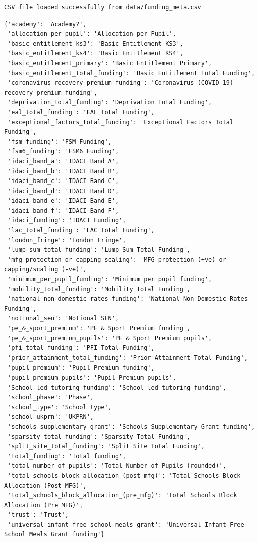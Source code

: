 \documentclass[
  letterpaper,
  DIV=11,
  numbers=noendperiod]{scrartcl}
\begin{document}
\begin{verbatim}
CSV file loaded successfully from data/funding_meta.csv
\end{verbatim}

\begin{verbatim}
{'academy': 'Academy?',
 'allocation_per_pupil': 'Allocation per Pupil',
 'basic_entitlement_ks3': 'Basic Entitlement KS3',
 'basic_entitlement_ks4': 'Basic Entitlement KS4',
 'basic_entitlement_primary': 'Basic Entitlement Primary',
 'basic_entitlement_total_funding': 'Basic Entitlement Total Funding',
 'coronavirus_recovery_premium_funding': 'Coronavirus (COVID-19) recovery premium funding',
 'deprivation_total_funding': 'Deprivation Total Funding',
 'eal_total_funding': 'EAL Total Funding',
 'exceptional_factors_total_funding': 'Exceptional Factors Total Funding',
 'fsm_funding': 'FSM Funding',
 'fsm6_funding': 'FSM6 Funding',
 'idaci_band_a': 'IDACI Band A',
 'idaci_band_b': 'IDACI Band B',
 'idaci_band_c': 'IDACI Band C',
 'idaci_band_d': 'IDACI Band D',
 'idaci_band_e': 'IDACI Band E',
 'idaci_band_f': 'IDACI Band F',
 'idaci_funding': 'IDACI Funding',
 'lac_total_funding': 'LAC Total Funding',
 'london_fringe': 'London Fringe',
 'lump_sum_total_funding': 'Lump Sum Total Funding',
 'mfg_protection_or_capping_scaling': 'MFG protection (+ve) or capping/scaling (-ve)',
 'minimum_per_pupil_funding': 'Minimum per pupil funding',
 'mobility_total_funding': 'Mobility Total Funding',
 'national_non_domestic_rates_funding': 'National Non Domestic Rates Funding',
 'notional_sen': 'Notional SEN',
 'pe_&_sport_premium': 'PE & Sport Premium funding',
 'pe_&_sport_premium_pupils': 'PE & Sport Premium pupils',
 'pfi_total_funding': 'PFI Total Funding',
 'prior_attainment_total_funding': 'Prior Attainment Total Funding',
 'pupil_premium': 'Pupil Premium funding',
 'pupil_premium_pupils': 'Pupil Premium pupils',
 'School_led_tutoring_funding': 'School-led tutoring funding',
 'school_phase': 'Phase',
 'school_type': 'School type',
 'school_ukprn': 'UKPRN',
 'schools_supplementary_grant': 'Schools Supplementary Grant funding',
 'sparsity_total_funding': 'Sparsity Total Funding',
 'split_site_total_funding': 'Split Site Total Funding',
 'total_funding': 'Total funding',
 'total_number_of_pupils': 'Total Number of Pupils (rounded)',
 'total_schools_block_allocation_(post_mfg)': 'Total Schools Block Allocation (Post MFG)',
 'total_schools_block_allocation_(pre_mfg)': 'Total Schools Block Allocation (Pre MFG)',
 'trust': 'Trust',
 'universal_infant_free_school_meals_grant': 'Universal Infant Free School Meals Grant funding'}
\end{verbatim}
\end{document}
